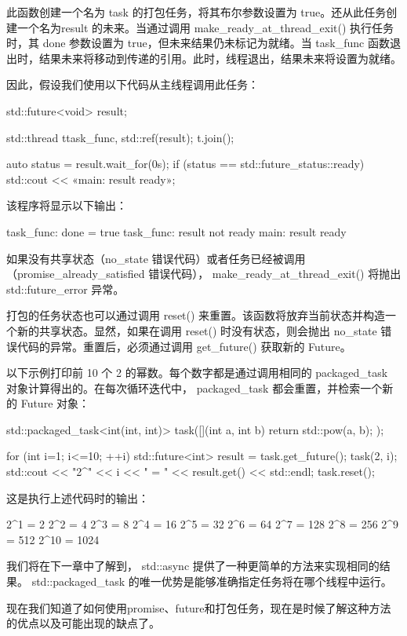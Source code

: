 此函数创建一个名为 task 的打包任务，将其布尔参数设置为 true。还从此任务创建一个名为result 的未来。当通过调用 make\_ready\_at\_thread\_exit() 执行任务时，其 done 参数设置为 true，但未来结果仍未标记为就绪。当 task\_func 函数退出时，结果未来将移动到传递的引用。此时，线程退出，结果未来将设置为就绪。

因此，假设我们使用以下代码从主线程调用此任务：

\begin{cpp}
std::future<void> result;

std::thread t{task_func, std::ref(result)};
t.join();

auto status = result.wait_for(0s);
if (status == std::future_status::ready)
    std::cout << «main: result ready\n»;
\end{cpp}

该程序将显示以下输出：

\begin{shell}
task_func: done = true
task_func: result not ready
main: result ready
\end{shell}

如果没有共享状态（no\_state 错误代码）或者任务已经被调用（promise\_already\_satisfied 错误代码）， make\_ready\_at\_thread\_exit() 将抛出 std::future\_error 异常。

打包的任务状态也可以通过调用 reset() 来重置。该函数将放弃当前状态并构造一个新的共享状态。显然，如果在调用 reset() 时没有状态，则会抛出 no\_state 错误代码的异常。重置后，必须通过调用 get\_future() 获取新的 Future。

以下示例打印前 10 个 2 的幂数。每个数字都是通过调用相同的 packaged\_task 对象计算得出的。在每次循环迭代中， packaged\_task 都会重置，并检索一个新的 Future 对象：

\begin{cpp}
std::packaged_task<int(int, int)> task([](int a, int b){
    return std::pow(a, b);
});

for (int i=1; i<=10; ++i) {
    std::future<int> result = task.get_future();
    task(2, i);
    std::cout << "2^" << i << " = "
              << result.get() << std::endl;
    task.reset();
}
\end{cpp}

这是执行上述代码时的输出：

\begin{shell}
2^1 = 2
2^2 = 4
2^3 = 8
2^4 = 16
2^5 = 32
2^6 = 64
2^7 = 128
2^8 = 256
2^9 = 512
2^10 = 1024
\end{shell}

我们将在下一章中了解到， std::async 提供了一种更简单的方法来实现相同的结果。 std::packaged\_task 的唯一优势是能够准确指定任务将在哪个线程中运行。

现在我们知道了如何使用promise、future和打包任务，现在是时候了解这种方法的优点以及可能出现的缺点了。